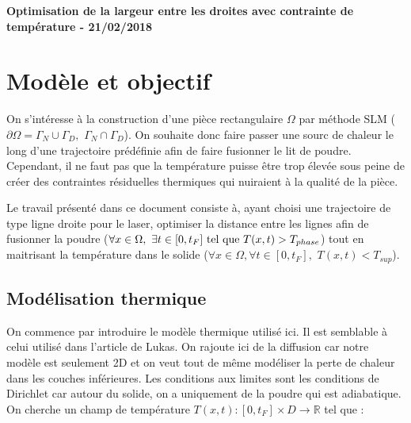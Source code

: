 \documentclass[11pt,a4paper]{article}
\begin{document}
\newcommand{\heavi}{h_{\epsilon}}
\newcommand{\heaviP}{h'_{\epsilon}}
\newcommand{\heaviPP}{h''_{\epsilon}}

\newcommand{\Math}[1]{\textcolor{red}{\textbf{#1}}}

\newcommand{\intO}{\int_{\Omega}}
\newcommand{\bigintO}{\bigint_{\Omega}}
\newcommand{\accDeuxcol}[1]{\left\{\begin{array}{ll}#1\end{array}\right.}
\newcommand{\accUnecol}[1]{\left\{\begin{array}{l}#1\end{array}\right.}

\begin{center}
	\textbf{Optimisation de la largeur entre les droites avec contrainte de température - 21/02/2018}
\end{center}


\section*{Modèle et objectif}

On s'intéresse à la construction d'une pièce rectangulaire $\Omega$ par méthode SLM ($\partial\Omega=\Gamma_N\cup\Gamma_D,\,\,\Gamma_N\cap\Gamma_D$). On souhaite donc faire passer une sourc de chaleur le long d'une trajectoire prédéfinie afin de faire fusionner le lit de poudre. Cependant, il ne faut pas que la température puisse être trop élevée sous peine de créer des contraintes résiduelles thermiques qui nuiraient à la qualité de la pièce. 

\vspace{0.5cm}

Le travail présenté dans ce document consiste à, ayant choisi une trajectoire de type ligne droite pour le laser, optimiser la distance entre les lignes afin de fusionner la poudre ($\forall x\in\Omega,\,\,\exists t\in[0,t_F]\,\,\textrm{tel\,\,que}\,\,T(x,t)>T_{phase}$) tout en maitrisant la température dans le solide ($\forall x\in\Omega,\forall t\in [0,t_F],\,\,T(x,t)<T_{sup}$).

\subsection*{Modélisation thermique}
On commence par introduire le modèle thermique utilisé ici. Il est semblable à celui utilisé dans l'article de Lukas. On rajoute ici de la diffusion car notre modèle est seulement 2D et on veut tout de même modéliser la perte de chaleur dans les couches inférieures. Les conditions aux limites sont les conditions de Dirichlet car autour du solide, on a uniquement de la poudre qui est adiabatique. On cherche un champ de température $T(x,t) : [0,t_F]\times D \rightarrow \mathbb{R}$ tel que :
\end{document}
